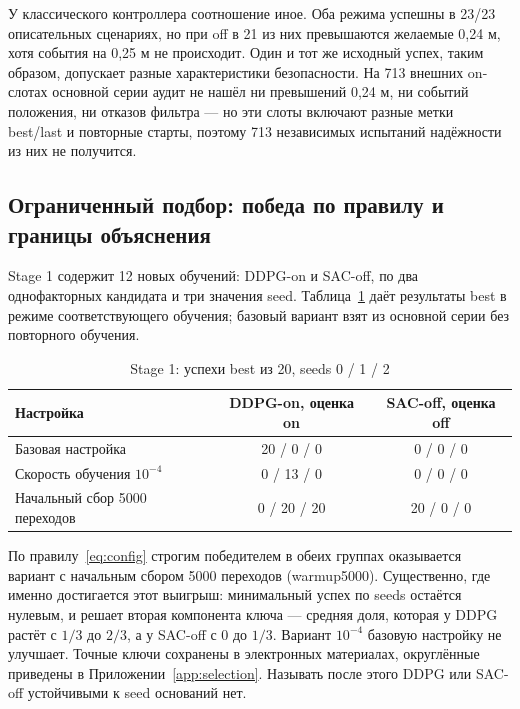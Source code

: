 У классического контроллера соотношение иное. Оба режима успешны в 23/23 описательных сценариях, но при off в 21 из них превышаются желаемые 0,24 м, хотя события на 0,25 м не происходит. Один и тот же исходный успех, таким образом, допускает разные характеристики безопасности. На 713 внешних on-слотах основной серии аудит не нашёл ни превышений 0,24 м, ни событий положения, ни отказов фильтра — но эти слоты включают разные метки best/last и повторные старты, поэтому 713 независимых испытаний надёжности из них не получится.

\subsection{Ограниченный подбор: победа по правилу и границы объяснения}
Stage 1 содержит 12 новых обучений: DDPG-on и SAC-off, по два однофакторных кандидата и три значения seed. Таблица~\ref{tab:stage} даёт результаты best в режиме соответствующего обучения; базовый вариант взят из основной серии без повторного обучения.
\begin{table}[htbp]\caption{Stage 1: успехи best из 20, seeds 0 / 1 / 2}\label{tab:stage}
\begin{smalltable}\begin{tabularx}{\linewidth}{@{}Xcc@{}}\toprule
Настройка & DDPG-on, оценка on & SAC-off, оценка off\\\midrule
Базовая настройка & 20 / 0 / 0 & 0 / 0 / 0\\
Скорость обучения $10^{-4}$ & 0 / 13 / 0 & 0 / 0 / 0\\
Начальный сбор 5000 переходов & 0 / 20 / 20 & 20 / 0 / 0\\\bottomrule
\end{tabularx}\end{smalltable}
\end{table}

По правилу~\eqref{eq:config} строгим победителем в обеих группах оказывается вариант с начальным сбором 5000 переходов (warmup5000). Существенно, где именно достигается этот выигрыш: минимальный успех по seeds остаётся нулевым, и решает вторая компонента ключа — средняя доля, которая у DDPG растёт с $1/3$ до $2/3$, а у SAC-off с 0 до $1/3$. Вариант $10^{-4}$ базовую настройку не улучшает. Точные ключи сохранены в электронных материалах, округлённые приведены в Приложении~\ref{app:selection}. Называть после этого DDPG или SAC-off устойчивыми к seed оснований нет.

